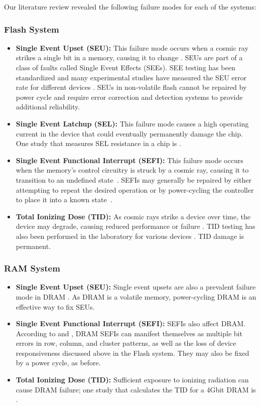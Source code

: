 Our literature review revealed the following failure modes for each of the systems:

\subsubsection{Flash System}\label{sec:flashmodel}
\begin{itemize}
  \item {\bf Single Event Upset (SEU):} This failure mode occurs when a cosmic ray strikes a single bit in a memory, causing it to change \cite{Gerardin2010Present}.  SEUs are part of a class of faults called Single Event Effects (SEEs).  SEE testing has been standardized \cite{Schwank2013Radiation} and many experimental studies have measured the SEU error rate for different devices \cite{Langley2004SEE, Oldham2008TID}.  SEUs in non-volatile flash cannot be repaired by power cycle and require error correction and detection systems to provide additional reliability.
  \item {\bf Single Event Latchup (SEL):} This failure mode causes a high operating current in the device that could eventually permanently damage the chip.  One study that measures SEL resistance in a chip is \cite{Langley2004SEE}.
  \item {\bf Single Event Functional Interrupt (SEFI):} This failure mode occurs when the memory's control circuitry is struck by a cosmic ray, causing it to transition to an undefined state~\cite{Langley2004SEE}.  SEFIs may generally be repaired by either attempting to repeat the desired operation or by power-cycling the controller to place it into a known state~\cite{Gerardin2010Present}.
  \item {\bf Total Ionizing Dose (TID):} As cosmic rays strike a device over time, the device may degrade, causing reduced performance or failure \cite{Gerardin2010Present}.  TID testing has also been performed in the laboratory for various devices \cite{Oldham2008TID}.  TID damage is permanent.
\end{itemize}
\subsubsection{RAM System}\label{sec:rammodel}
\begin{itemize}
  \item {\bf Single Event Upset (SEU):} Single event upsets are also a prevalent failure mode in DRAM \cite{gruermann2011studies, Gliem2012memory}.  As DRAM is a volatile memory, power-cycling DRAM is an effective way to fix SEUs.
  \item {\bf Single Event Functional Interrupt (SEFI):} SEFIs also affect DRAM.  According to \cite{gruermann2011studies} and \cite{Gliem2012memory}, DRAM SEFIs can manifest themselves as multiple bit errors in row, column, and cluster patterns, as well as the loss of device responsiveness discussed above in the Flash system.  They may also be fixed by a power cycle, as before.
  \item {\bf Total Ionizing Dose (TID):} Sufficient exposure to ionizing radiation can cause DRAM failure; one study that calculates the TID for a 4Gbit DRAM is \cite{Herrmann2013InSitu}.
\end{itemize}

